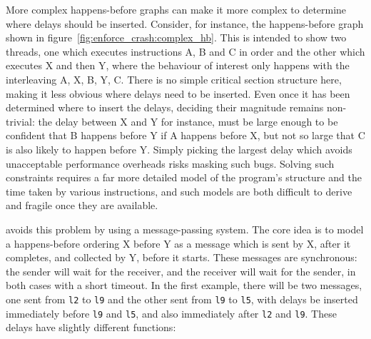More complex happens-before graphs can make it more complex to
determine where delays should be inserted.  Consider, for instance,
the happens-before graph shown in
figure~\ref{fig:enforce_crash:complex_hb}.  This is intended to show
two threads, one which executes instructions A, B and C in order and
the other which executes X and then Y, where the behaviour of interest
only happens with the interleaving A, X, B, Y, C.  There is no simple
critical section structure here, making it less obvious where delays
need to be inserted.  Even once it has been determined where to insert
the delays, deciding their magnitude remains non-trivial: the delay
between X and Y for instance, must be large enough to be confident
that B happens before Y if A happens before X, but not so large that C
is also likely to happen before Y.  Simply picking the largest delay
which avoids unacceptable performance overheads risks masking such
bugs.  Solving such constraints requires a far more detailed model of
the program's structure and the time taken by various instructions,
and such models are both difficult to derive and fragile once they are
available.

{\Technique} avoids this problem by using a message-passing system.
The core idea is to model a happens-before ordering X before Y as a
message which is sent by X, after it completes, and collected by Y,
before it starts.  These messages are synchronous: the sender will
wait for the receiver, and the receiver will wait for the sender, in
both cases with a short timeout.  In the first example, there will be
two messages, one sent from \verb|l2| to \verb|l9| and the other sent
from \verb|l9| to \verb|l5|, with delays be inserted immediately
before \verb|l9| and \verb|l5|, and also immediately after \verb|l2|
and \verb|l9|.  These delays have slightly different functions:

